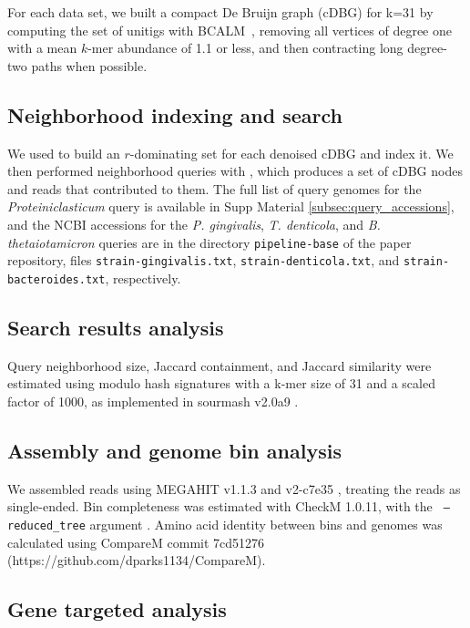 For each data set, we built a compact De Bruijn graph (cDBG) for
k=31 by computing the set of unitigs with
BCALM~\cite{chikhi2016compacting}, removing all vertices of degree one
with a mean $k$-mer abundance of 1.1 or less, and then contracting
long degree-two paths when possible.

\subsection*{Neighborhood indexing and search}

We used \sgc to build an $r$-dominating set for each denoised cDBG and
index it. We then performed neighborhood queries with \sgc, which
produces a set of cDBG nodes and reads that contributed to them.  The
full list of query genomes for the {\em Proteiniclasticum} query is
  available in Supp Material \ref{subsec:query_accessions}, and
  the NCBI accessions for the {\em P. gingivalis}, {\em T. denticola}, 
and {\em B. thetaiotamicron} queries are in the directory {\tt pipeline-base} 
of the paper repository, files {\tt strain-gingivalis.txt}, 
{\tt strain-denticola.txt}, and {\tt strain-bacteroides.txt}, respectively.

\subsection*{Search results analysis}

Query neighborhood size, Jaccard containment, and Jaccard similarity
were estimated using modulo hash signatures with a k-mer size of 31 and
a scaled factor of 1000, as implemented in sourmash v2.0a9
\cite{sourmash}.

\subsection*{Assembly and genome bin analysis}

We assembled reads using MEGAHIT v1.1.3 \cite{megahit} and \plass
v2-c7e35 \cite{plass}, treating the reads as single-ended. Bin
completeness was estimated with CheckM 1.0.11, with the {\tt
  --reduced\_tree} argument \cite{CheckM}.  Amino acid identity
between bins and genomes was calculated using CompareM commit
7cd51276 (https://github.com/dparks1134/CompareM).

\subsection*{Gene targeted analysis}

